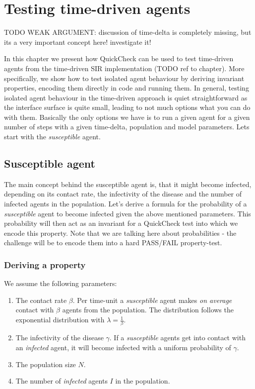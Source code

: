 \chapter{Testing time-driven agents}

TODO WEAK ARGUMENT: discussion of time-delta is completely missing, but its a very important concept here! investigate it!

In this chapter we present how QuickCheck can be used to test time-driven agents from the time-driven SIR implementation (TODO ref to chapter). More specifically, we show how to test isolated agent behaviour by deriving invariant properties, encoding them directly in code and running them. 
In general, testing isolated agent behaviour in the time-driven approach is quiet straightforward as the interface surface is quite small, leading to not much options what you can do with them. Basically the only options we have is to run a given agent for a given number of steps with a given time-delta, population and model parameters. Lets start with the \textit{susceptible} agent.

\section{Susceptible agent}
The main concept behind the susceptible agent is, that it might become infected, depending on its contact rate, the infectivity of the disease and the number of infected agents in the population. Let's derive a formula for the probability of a \textit{susceptible} agent to become infected given the above mentioned parameters. This probability will then act as an invariant for a QuickCheck test into which we encode this property. Note that we are talking here about probabilities - the challenge will be to encode them into a hard PASS/FAIL property-test.

\subsection{Deriving a property}
We assume the following parameters:

\begin{enumerate}
	\item The contact rate $\beta$. Per time-unit a \textit{susceptible} agent makes \textit{on average} contact with $\beta$ agents from the population. The distribution follows the exponential distribution with $\lambda = \frac{1}{\beta}$.
	\item The infectivity of the disease $\gamma$. If a \textit{susceptible} agents get into contact with an \textit{infected} agent, it will become infected with a uniform probability of $\gamma$. 
	\item The population size $N$.
	\item The number of \textit{infected} agents $I$ in the population.
\end{enumerate}

